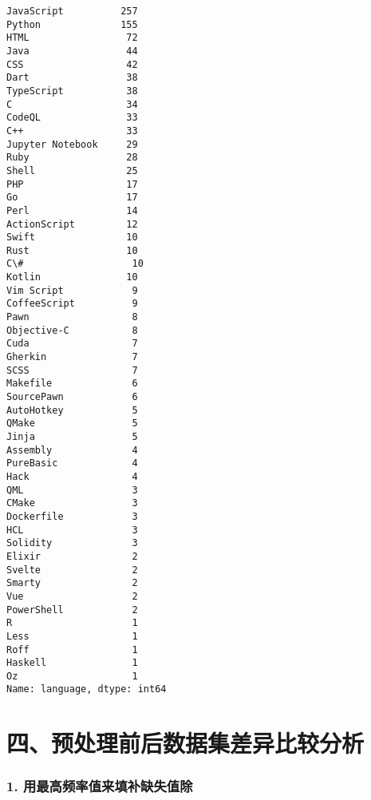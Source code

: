 \documentclass[11pt]{article}
\makeatletter
\newcommand{\boxspacing}{\kern\kvtcb@left@rule\kern\kvtcb@boxsep}
\newcommand{\prompt}[4]{
        {\ttfamily\llap{{\color{#2}[#3]:\hspace{3pt}#4}}\vspace{-\baselineskip}}
    }
\makeatother
\begin{document}
            \begin{tcolorbox}[breakable, size=fbox, boxrule=.5pt, pad at break*=1mm, opacityfill=0]
\prompt{Out}{outcolor}{19}{\boxspacing}
\begin{Verbatim}[commandchars=\\\{\}]
JavaScript          257
Python              155
HTML                 72
Java                 44
CSS                  42
Dart                 38
TypeScript           38
C                    34
CodeQL               33
C++                  33
Jupyter Notebook     29
Ruby                 28
Shell                25
PHP                  17
Go                   17
Perl                 14
ActionScript         12
Swift                10
Rust                 10
C\#                   10
Kotlin               10
Vim Script            9
CoffeeScript          9
Pawn                  8
Objective-C           8
Cuda                  7
Gherkin               7
SCSS                  7
Makefile              6
SourcePawn            6
AutoHotkey            5
QMake                 5
Jinja                 5
Assembly              4
PureBasic             4
Hack                  4
QML                   3
CMake                 3
Dockerfile            3
HCL                   3
Solidity              3
Elixir                2
Svelte                2
Smarty                2
Vue                   2
PowerShell            2
R                     1
Less                  1
Roff                  1
Haskell               1
Oz                    1
Name: language, dtype: int64
\end{Verbatim}
\end{tcolorbox}
        
    \section{四、预处理前后数据集差异比较分析}\label{ux56dbux9884ux5904ux7406ux524dux540eux6570ux636eux96c6ux5deeux5f02ux6bd4ux8f83ux5206ux6790}

    \subsubsection{1.
用最高频率值来填补缺失值除}\label{ux7528ux6700ux9ad8ux9891ux7387ux503cux6765ux586bux8865ux7f3aux5931ux503cux9664}
\end{document}
